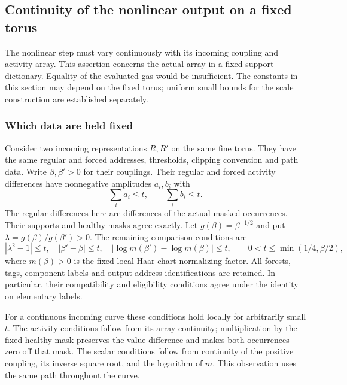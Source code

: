 \subsection{Continuity of the nonlinear output on a fixed torus}
\label{sec:finite-volume-parameter-continuity}
The nonlinear step must vary continuously with its incoming coupling
and activity array. This assertion concerns the actual array in a
fixed support dictionary. Equality of the evaluated gas would be
insufficient. The constants in this section may depend on the fixed
torus; uniform small bounds for the scale construction are established
separately.

\subsubsection{Which data are held fixed}
Consider two incoming representations $R,R'$ on the same fine torus.
They have the same regular and forced addresses, thresholds, clipping
convention and path data. Write $\beta,\beta'>0$ for their couplings.
Their regular and forced activity differences have nonnegative
amplitudes $a_i,b_i$ with
\[
                  \sum_i a_i\le t,\qquad \sum_i b_i\le t.
\]
The regular differences here are differences of the actual masked
occurrences. Their supports and healthy masks agree exactly.
Let $g(\beta)=\beta^{-1/2}$ and put
$\lambda=g(\beta)/g(\beta')>0$. The remaining comparison conditions
are
\begin{equation}\label{eq:parameter-close-input}
 |\lambda^2-1|\le t,\quad |\beta'-\beta|\le t,\quad
 |\log m(\beta')-\log m(\beta)|\le t,
 \qquad 0<t\le\min(1/4,\beta/2),
\end{equation}
where $m(\beta)>0$ is the fixed local Haar-chart normalizing factor.
All forests, tags, component labels and output address identifications
are retained. In particular, their compatibility and eligibility
conditions agree under the identity on elementary labels.

For a continuous incoming curve these conditions hold locally for
arbitrarily small $t$. The activity conditions follow from its array
continuity; multiplication by the fixed healthy mask preserves the
value difference and makes both occurrences zero off that mask.
The scalar conditions follow from continuity of the positive coupling,
its inverse square root, and the logarithm of $m$. This observation
uses the same path throughout the curve.

